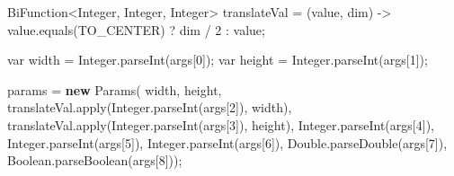 \documentclass[11pt]{article}
\newenvironment{Shaded}{}{}
\newcommand{\KeywordTok}[1]{\textcolor[rgb]{0.00,0.44,0.13}{\textbf{{#1}}}}
\newcommand{\DataTypeTok}[1]{\textcolor[rgb]{0.56,0.13,0.00}{{#1}}}
\newcommand{\DecValTok}[1]{\textcolor[rgb]{0.25,0.63,0.44}{{#1}}}
\newcommand{\FunctionTok}[1]{\textcolor[rgb]{0.02,0.16,0.49}{{#1}}}
\newcommand{\NormalTok}[1]{{#1}}
\newcommand{\OperatorTok}[1]{\textcolor[rgb]{0.40,0.40,0.40}{{#1}}}
\newcommand{\BuiltInTok}[1]{{#1}}
\begin{document}
\begin{Shaded}
\begin{Highlighting}[]
\NormalTok{            BiFunction}\OperatorTok{\textless{}}\BuiltInTok{Integer}\OperatorTok{,} \BuiltInTok{Integer}\OperatorTok{,} \BuiltInTok{Integer}\OperatorTok{\textgreater{}}\NormalTok{ translateVal }\OperatorTok{=} \OperatorTok{(}\NormalTok{value}\OperatorTok{,}\NormalTok{ dim}\OperatorTok{)} \OperatorTok{{-}\textgreater{}}
\NormalTok{                    value}\OperatorTok{.}\FunctionTok{equals}\OperatorTok{(}\NormalTok{TO\_CENTER}\OperatorTok{)} \OperatorTok{?}\NormalTok{ dim }\OperatorTok{/} \DecValTok{2} \OperatorTok{:}\NormalTok{ value}\OperatorTok{;}

            \DataTypeTok{var}\NormalTok{ width }\OperatorTok{=} \BuiltInTok{Integer}\OperatorTok{.}\FunctionTok{parseInt}\OperatorTok{(}\NormalTok{args}\OperatorTok{[}\DecValTok{0}\OperatorTok{]);}
            \DataTypeTok{var}\NormalTok{ height }\OperatorTok{=} \BuiltInTok{Integer}\OperatorTok{.}\FunctionTok{parseInt}\OperatorTok{(}\NormalTok{args}\OperatorTok{[}\DecValTok{1}\OperatorTok{]);}

\NormalTok{            params }\OperatorTok{=} \KeywordTok{new} \FunctionTok{Params}\OperatorTok{(}
\NormalTok{                    width}\OperatorTok{,}
\NormalTok{                    height}\OperatorTok{,}
\NormalTok{                    translateVal}\OperatorTok{.}\FunctionTok{apply}\OperatorTok{(}\BuiltInTok{Integer}\OperatorTok{.}\FunctionTok{parseInt}\OperatorTok{(}\NormalTok{args}\OperatorTok{[}\DecValTok{2}\OperatorTok{]),}\NormalTok{ width}\OperatorTok{),}
\NormalTok{                    translateVal}\OperatorTok{.}\FunctionTok{apply}\OperatorTok{(}\BuiltInTok{Integer}\OperatorTok{.}\FunctionTok{parseInt}\OperatorTok{(}\NormalTok{args}\OperatorTok{[}\DecValTok{3}\OperatorTok{]),}\NormalTok{ height}\OperatorTok{),}
                    \BuiltInTok{Integer}\OperatorTok{.}\FunctionTok{parseInt}\OperatorTok{(}\NormalTok{args}\OperatorTok{[}\DecValTok{4}\OperatorTok{]),}
                    \BuiltInTok{Integer}\OperatorTok{.}\FunctionTok{parseInt}\OperatorTok{(}\NormalTok{args}\OperatorTok{[}\DecValTok{5}\OperatorTok{]),}
                    \BuiltInTok{Integer}\OperatorTok{.}\FunctionTok{parseInt}\OperatorTok{(}\NormalTok{args}\OperatorTok{[}\DecValTok{6}\OperatorTok{]),}
                    \BuiltInTok{Double}\OperatorTok{.}\FunctionTok{parseDouble}\OperatorTok{(}\NormalTok{args}\OperatorTok{[}\DecValTok{7}\OperatorTok{]),}
                    \BuiltInTok{Boolean}\OperatorTok{.}\FunctionTok{parseBoolean}\OperatorTok{(}\NormalTok{args}\OperatorTok{[}\DecValTok{8}\OperatorTok{]));}


\end{Highlighting}
\end{Shaded}
\end{document}
